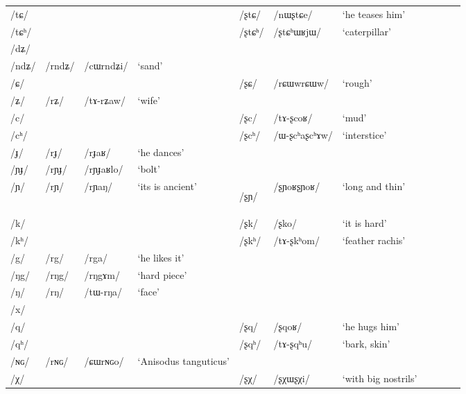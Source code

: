 \documentclass[12pt]{article}
\newcommand{\ipa}[1]{\mbox{\phon/#1/}}
\newcommand{\deux}[1]{\ipa{#1}\addtocounter{2clusters}{1}}
\newcommand{\idph}[1]{\cellcolor{gray}\textbf{#1}}
\newcommand{\resetcounters}[2]{
\newcounter{#1}
\newcounter{#2}
 \setcounter{#1}{\value{2clusters}}
  \setcounter{#2}{\value{3clusters}}
 \setcounter{2clusters}{0}
  \setcounter{3clusters}{0}
}
\begin{document}
\begin{landscape}
\begin{longtable}{lllllllllll}
\ipa{tɕ}  & 	  & 	  & 	  & 	 \deux{ʂtɕ}  & 	 \ipa{nɯʂtɕe}  & 	 `he teases him'  & 	\\
\ipa{tɕʰ}  & 	  & 	  & 	  & 	 \deux{ʂtɕʰ}  & 	 \ipa{ʂtɕʰɯʁjɯ}  & 	 `caterpillar'  & 	\\
\ipa{dʑ}  & 	  & 	  & 	  & 	  & 	  & 	  & 	\\
\ipa{ndʑ}  & 	 \deux{rndʑ}  & 	 \ipa{cɯrndʑi}  & 	 `sand'  & 	  & 	  & 	  & 	\\
\ipa{ɕ}  & 	  & 	  & 	  & 	 \deux{ʂɕ}  & 	 \ipa{rɕɯwrɕɯw}  & 	 `rough'  & 	\\
\ipa{ʑ}  & 	 \deux{rʑ}  & 	 \ipa{tɤ-rʑaw}  & 	 `wife'  & 	  & 	  & 	  & 	\\
\ipa{c}  & 	  & 	  & 	  & 	 \deux{ʂc}  & 	 \ipa{tɤ-ʂcoʁ}  & 	 `mud'  & 	\\
\ipa{cʰ}  & 	  & 	  & 	  & 	 \deux{ʂcʰ}  & 	 \ipa{ɯ-ʂcʰaʂcʰɤw}  & 	 `interstice'  & 	\\
\ipa{ɟ}  & 	 \deux{rɟ}  & 	 \ipa{rɟaʁ}  & 	 `he dances'  & 	  & 	  & 	  & 	\\
\ipa{ɲɟ}  & 	 \deux{rɲɟ}  & 	 \ipa{rɲɟaʁlo}  & 	 `bolt'  & 	  & 	  & 	  & 	\\
\ipa{ɲ}  & 	 \deux{rɲ}  & 	 \ipa{rɲaŋ}  & 	 `its is ancient'  & 	 \deux{ʂɲ} \idph{}  & 	 \ipa{ʂɲoʁʂɲoʁ}  & 	 `long and thin'  & 	\\
\ipa{k}  & 	  & 	  & 	  & 	 \deux{ʂk}  & 	 \ipa{ʂko}  & 	 `it is hard'  & 	\\
\ipa{kʰ}  & 	  & 	  & 	  & 	 \deux{ʂkʰ}  & 	 \ipa{tɤ-ʂkʰom}  & 	 `feather rachis'  & 	\\
\ipa{g}  & 	 \deux{rg}  & 	 \ipa{rga}  & 	 `he likes it'  & 	  & 	  & 	  & 	\\
\ipa{ŋg}  & 	 \deux{rŋg}  & 	 \ipa{rŋgɤm}  & 	 `hard piece'  & 	  & 	  & 	  & 	\\
\ipa{ŋ}  & 	 \deux{rŋ}  & 	 \ipa{tɯ-rŋa}  & 	 `face'  & 	  & 	  & 	  & 	\\
\ipa{x}  & 	  & 	  & 	  & 	  & 	  & 	  & 	\\
\ipa{q}  & 	  & 	  & 	  & 	 \deux{ʂq}  & 	 \ipa{ʂqoʁ}  & 	 `he hugs him'  & 	\\
\ipa{qʰ}  & 	  & 	  & 	  & 	 \deux{ʂqʰ}  & 	 \ipa{tɤ-ʂqʰu}  & 	 `bark, skin'  & 	\\
\ipa{ɴɢ}  & 	 \deux{rɴɢ}  & 	 \ipa{ɕɯrɴɢo}  & 	 `Anisodus tanguticus'  & 	  & 	  & 	  & 	\\
\ipa{χ}  & 	  & 	  & 	  & 	 \deux{ʂχ}  & 	 \ipa{ʂχɯʂχi}  & 	 `with big nostrils'  & 	\\
\bottomrule
\end{longtable}
\end{landscape}
 \resetcounters{2rC}{3rC} %
\end{document}

